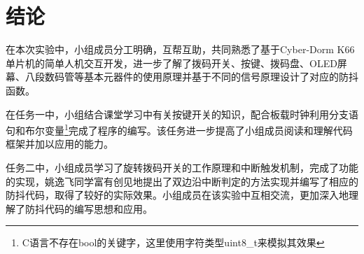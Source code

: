 \documentclass[12pt]{article}
\begin{document}
\section{结论}

在本次实验中，小组成员分工明确，互帮互助，共同熟悉了基于Cyber-Dorm K66单片机的简单人机交互开发，进一步了解了拨码开关、按键、拨码盘、OLED屏幕、八段数码管等基本元器件的使用原理并基于不同的信号原理设计了对应的防抖函数。

在任务一中，小组结合课堂学习中有关按键开关的知识，配合板载时钟利用分支语句和布尔变量\footnote{C语言不存在bool的关键字，这里使用字符类型uint8\_t来模拟其效果}完成了程序的编写。该任务进一步提高了小组成员阅读和理解代码框架并加以应用的能力。

任务二中，小组成员学习了旋转拨码开关的工作原理和中断触发机制，完成了功能的实现，姚逸飞同学富有创见地提出了双边沿中断判定的方法实现并编写了相应的防抖代码，取得了较好的实际效果。小组成员在该实验中互相交流，更加深入地理解了防抖代码的编写思想和应用。
\end{document}
